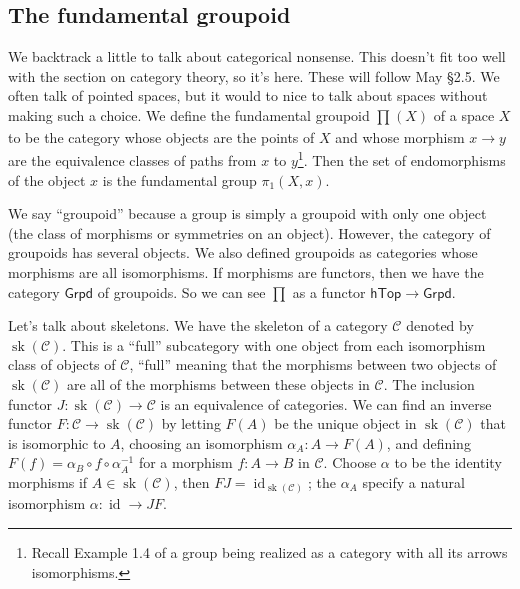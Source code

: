 \subsection{The fundamental groupoid}
We backtrack a little to talk about categorical nonsense. This doesn't fit too well with the section on category theory, so it's here. These will follow May \S 2.5.
\orbreak
We often talk of pointed spaces, but it would to nice to talk about spaces without making such a choice. We define the fundamental groupoid $\prod_{}^{} (X) $ of a space $X$ to be the category whose objects are the points of $X$ and whose morphism $x \to y$ are the equivalence classes of paths from $x$ to $y$\footnote{Recall Example 1.4 of a group being realized as a category with all its arrows isomorphisms.}. Then the set of endomorphisms of the object $x$ is the fundamental group $\pi_1(X,x)$.

We say ``groupoid'' because a group is simply a groupoid with only one object (the class of morphisms or symmetries on an object). However, the category of groupoids has several objects. We also defined groupoids as categories whose morphisms are all isomorphisms. If morphisms are functors, then we have the category $\mathsf{Grpd} $ of groupoids. So we can see $\prod $ as a functor $\mathsf{hTop} \to \mathsf{Grpd} $.

Let's talk about skeletons. We have the skeleton of a category $\mathcal{C} $ denoted by $\operatorname{sk}(\mathcal{C}) $. This is a ``full'' subcategory with one object from each isomorphism class of objects of $\mathcal{C} $, ``full'' meaning that the morphisms between two objects of $\operatorname{sk}(\mathcal{C} )$ are all of the morphisms between these objects in $\mathcal{C} $. The inclusion functor $J \colon \operatorname{sk}(\mathcal{C} ) \to \mathcal{C} $ is an equivalence of categories. We can find an inverse functor $F \colon \mathcal{C}  \to \operatorname{sk}(\mathcal{C} )$ by letting $F(A)$ be the unique object in $\operatorname{sk}(\mathcal{C} )$ that is isomorphic to $A$, choosing an isomorphism $\alpha _A \colon A \to F(A)$, and defining $F(f)=\alpha _B \circ f \circ \alpha_A^{-1}$ for a morphism $f \colon  A \to B$ in $\mathcal{C} $. Choose $\alpha $ to be the identity morphisms if $A\in \operatorname{sk}(\mathcal{C} )$, then $FJ=\operatorname{id}_{\operatorname{sk}(\mathcal{C} )}$; the $\alpha _A$ specify a natural isomorphism $\alpha \colon \operatorname{id} \to JF $.

